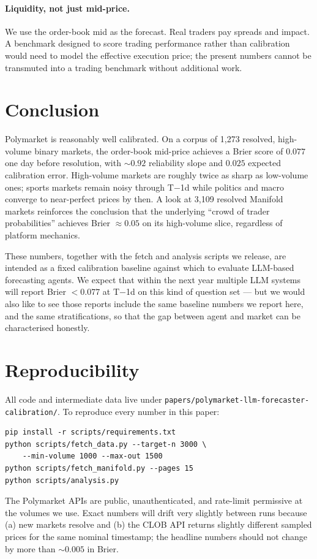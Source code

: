 \documentclass{article}
\begin{document}
\paragraph{Liquidity, not just mid-price.}
We use the order-book mid as the forecast. Real traders pay
spreads and impact. A benchmark designed to score trading performance
rather than calibration would need to model the effective execution
price; the present numbers cannot be transmuted into a trading
benchmark without additional work.

\section{Conclusion}

Polymarket is reasonably well calibrated. On a corpus of 1{,}273
resolved, high-volume binary markets, the order-book mid-price
achieves a Brier score of $0.077$ one day before resolution, with
$\sim 0.92$ reliability slope and $0.025$ expected calibration
error. High-volume markets are roughly twice as sharp as low-volume
ones; sports markets remain noisy through T$-$1d while politics and
macro converge to near-perfect prices by then. A look at 3{,}109
resolved Manifold markets reinforces the conclusion that the
underlying ``crowd of trader probabilities'' achieves Brier
$\approx 0.05$ on its high-volume slice, regardless of platform
mechanics.

These numbers, together with the fetch and analysis scripts we
release, are intended as a fixed calibration baseline against which
to evaluate LLM-based forecasting agents. We expect that within the
next year multiple LLM systems will report Brier $< 0.077$ at
T$-$1d on this kind of question set --- but we would also like to see
those reports include the same baseline numbers we report here, and
the same stratifications, so that the gap between agent and market
can be characterised honestly.

\section*{Reproducibility}

All code and intermediate data live under
\texttt{papers/polymarket-llm-forecaster-calibration/}. To
reproduce every number in this paper:

\begin{verbatim}
pip install -r scripts/requirements.txt
python scripts/fetch_data.py --target-n 3000 \
    --min-volume 1000 --max-out 1500
python scripts/fetch_manifold.py --pages 15
python scripts/analysis.py
\end{verbatim}

The Polymarket APIs are public, unauthenticated, and rate-limit
permissive at the volumes we use. Exact numbers will drift very
slightly between runs because (a) new markets resolve and (b) the
CLOB API returns slightly different sampled prices for the same
nominal timestamp; the headline numbers should not change by more
than $\sim 0.005$ in Brier.



\end{document}
